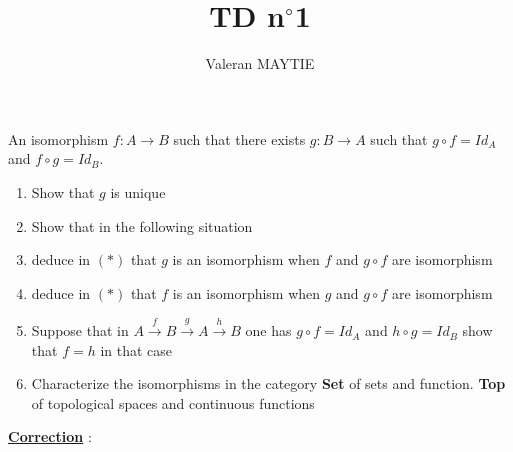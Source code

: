 \documentclass{article}
\title{TD n$^\circ$1}
\author{Valeran MAYTIE}
\date{}
\theoremstyle{plain}
\begin{document}
  \maketitle

  An isomorphism $f : A \to B$ such that there exists $g: B \to A$ such that $g
  \circ f = Id_A$ and $f \circ g = Id_B$.

  \begin{enumerate}
    \item Show that $g$ is unique
    \item Show that in the following situation

    \begin{center}
    \end{center}

    \item deduce in $(*)$ that $g$ is an isomorphism when $f$ and $g \circ f$ are
      isomorphism
    \item deduce in $(*)$ that $f$ is an isomorphism when $g$ and $g \circ f$ are
      isomorphism
    \item Suppose that in $A \xrightarrow{f} B \xrightarrow{g} A \xrightarrow{h}
      B$ one has $g \circ f = Id_A$ and $h \circ g = Id_B$ show that $f = h$
      in that case
    \item Characterize the isomorphisms in the category {\bf Set} of sets and
      function. {\bf Top} of topological spaces and continuous functions
  \end{enumerate}

  \underline{\bf Correction} :
\end{document}
